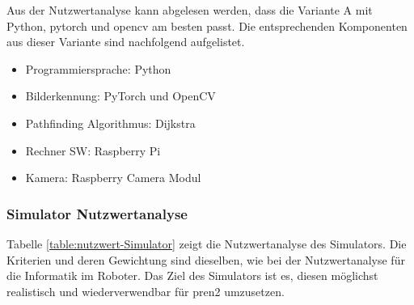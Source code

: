Aus der Nutzwertanalyse kann abgelesen werden, dass die Variante A mit Python, \gls{pytorch} und \gls{opencv} am besten passt. Die entsprechenden Komponenten aus dieser Variante sind nachfolgend aufgelistet.

\begin{itemize}
    \item Programmiersprache: Python
    \item Bilderkennung: PyTorch und OpenCV
    \item Pathfinding Algorithmus: Dijkstra
    \item Rechner SW: Raspberry Pi
    \item Kamera: Raspberry Camera Modul
\end{itemize}

\subsubsection*{Simulator Nutzwertanalyse}

Tabelle \ref{table:nutzwert-Simulator} zeigt die Nutzwertanalyse des Simulators. Die Kriterien und deren Gewichtung sind dieselben, wie bei der Nutzwertanalyse für die Informatik im Roboter. Das Ziel des Simulators ist es, diesen möglichst realistisch und wiederverwendbar für \acrshort{pren2} umzusetzen.

